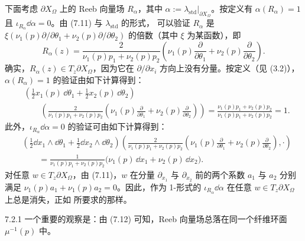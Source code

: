 下面考虑 $\partial X_\Omega$ 上的 Reeb 向量场 $R_\alpha$，其中
$\alpha:=\lambda_{\mathrm{std}}|_{\partial X_\Omega}$。按定义有 $\alpha(R_\alpha)=1$
且 $\iota_{R_\alpha}\dd\alpha=0$。由 (7.11) 与 $\lambda_{\mathrm{std}}$ 的形式，
可以验证 $R_\alpha$ 是 $\xi(\nu_1(p)\partial/\partial\theta_1
+\nu_2(p)\partial/\partial\theta_2)$ 的倍数（其中 $\xi$ 为某函数），即
\begin{equation}\tag{7.12}
  R_\alpha(z)=\frac{2}{\nu_1(p)p_1+\nu_2(p)p_2}
  \left(\nu_1(p)\frac{\partial}{\partial\theta_1}
  +\nu_2(p)\frac{\partial}{\partial\theta_2}\right).
\end{equation}
确实，$R_\alpha(z)\in T_z\partial X_\Omega$，因为它在
$\partial/\partial x_i$ 方向上没有分量。按定义（见 (3.2)），$\alpha(R_\alpha)=1$
的验证由如下计算得到：
\[
  \begin{aligned}
    &\left(\frac12x_1(p)\,\dd\theta_1+\frac12x_2(p)\,\dd\theta_2\right)\\
    &\qquad\left(\frac{2}{\nu_1(p)p_1+\nu_2(p)p_2}
    \left(\nu_1(p)\frac{\partial}{\partial\theta_1}
    +\nu_2(p)\frac{\partial}{\partial\theta_2}\right)\right)
    =\frac{\nu_1(p)p_1+\nu_2(p)p_2}{\nu_1(p)p_1+\nu_2(p)p_2}=1.
  \end{aligned}
\]
此外，$\iota_{R_\alpha}\dd\alpha=0$ 的验证可由如下计算得到：
\begin{align*}
  &\left(\frac12\dd x_1\wedge\dd\theta_1
  +\frac12\dd x_2\wedge\dd\theta_2\right)
  \left(\frac{2}{\nu_1(p)p_1+\nu_2(p)p_2}
  \left(\nu_1(p)\frac{\partial}{\partial\theta_1}
  +\nu_2(p)\frac{\partial}{\partial\theta_2}\right),\cdot\right)\\
  &\qquad=\frac{1}{\nu_1(p)p_1+\nu_2(p)p_2}
  \bigl(\nu_1(p)\,\dd x_1+\nu_2(p)\,\dd x_2\bigr).
\end{align*}
对任意 $w\in T_z\partial X_\Omega$，由 (7.11)，$w$ 在分量 $\partial_{x_1}$ 与
$\partial_{x_2}$ 前的两个系数 $a_1$ 与 $a_2$ 分别满足
$\nu_1(p)a_1+\nu_1(p)a_2=0$。因此，作为 1-形式的
$\iota_{R_\alpha}\dd\alpha$ 在任意 $w\in T_z\partial X_\Omega$ 上总是消失，正如
所要求的那样。


\begin{wrem}{7.2.1}
  一个重要的观察是：由 (7.12) 可知，Reeb 向量场总落在同一个纤维环面
  $\mu^{-1}(p)$ 中。
\end{wrem}

